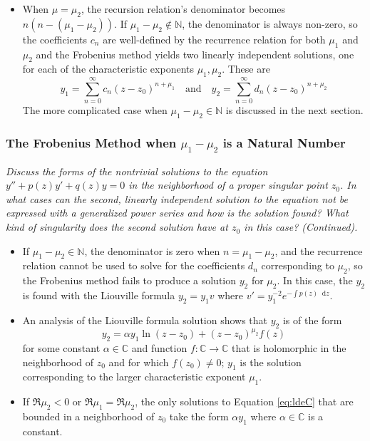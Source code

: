 \documentclass[11pt, a4paper]{article}
\newcommand{\question}[1]{\textit{#1}\vspace{2mm}}
\newcommand{\C}{\mathbb{C}} %
\newcommand{\diff}{\mathop{}\!\mathrm{d}} %
\begin{document}
\begin{itemize}
	\item When $ \mu = \mu_{2} $, the recursion relation's denominator becomes $ n(n - (\mu_{1} - \mu_{2})) $. If $ \mu_{1} - \mu_{2} \notin \mathbb{N} $, the denominator is always non-zero, so the coefficients $ c_{n} $ are well-defined by the recurrence relation for both $ \mu_{1} $ and $ \mu_{2} $ and the Frobenius method yields two linearly independent solutions, one for each of the characteristic exponents $ \mu_{1}, \mu_{2}$. These are
	\begin{equation*}
		y_{1} = \sum_{n=0}^{\infty}c_n(z-z_0)^{n+\mu_{1}} \quad \text{and} \quad y_{2} = \sum_{n=0}^{\infty}d_n(z-z_0)^{n+\mu_{2}}
	\end{equation*}
	The more complicated case when $ \mu_{1} - \mu_{2} \in \mathbb{N} $ is discussed in the next section.

	
\end{itemize}
	



\subsubsection{The Frobenius Method when $ \mu_{1} - \mu_{2} $ is a Natural Number}
\question{Discuss the forms of the nontrivial solutions to the equation $ y'' + p(z)y' + q(z)y = 0 $ in the neighborhood of a proper singular point $ z_0 $. In what cases can the second, linearly independent solution to the equation not be expressed with a generalized power series and how is the solution found? What kind of singularity does the second solution have at $ z_0 $ in this case? (Continued).}

\begin{itemize}
	\item If $ \mu_{1} - \mu_{2} \in \mathbb{N} $, the denominator is zero when $ n =  \mu_{1} - \mu_{2} $, and the recurrence relation cannot be used to solve for the coefficients $ d_{n} $ corresponding to $ \mu_{2} $, so the Frobenius method fails to produce a solution $ y_{2} $ for $ \mu_{2} $. In this case, the $ y_{2} $ is found with the Liouville formula $ y_{2} = y_{1} v $ where $ v' = y_{1}^{-2} e^{-\int p(z) \diff z} $. 


	\item An analysis of the Liouville formula solution shows that $ y_{2} $ is of the form
	\begin{equation*}
		y_{2} = \alpha y_{1} \ln (z-z_{0}) + (z-z_{0})^{\mu_{2}}f(z)
	\end{equation*}
	for some constant $ \alpha \in \C $ and function $ f : \C \to \C $ that is holomorphic in the neighborhood of $ z_{0} $ and for which $ f(z_{0}) \neq 0$; $ y_{1} $ is the solution corresponding to the larger characteristic exponent $ \mu_{1} $.
	
	\item If $ \Re \mu_{2} < 0 $ or $ \Re\mu_{1} = \Re \mu_{2} $, the only solutions to Equation \ref{eq:ldeC} that are bounded in a neighborhood of $ z_{0} $ take the form $ \alpha y_{1} $ where $ \alpha \in \C $ is a constant.
\end{itemize}
\end{document}
